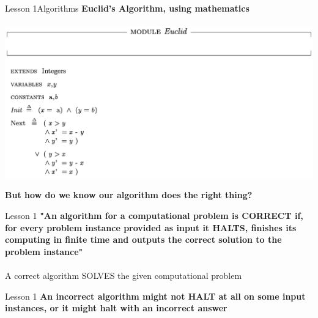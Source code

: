 \documentclass[aspectratio=1610]{beamer}
\begin{document}
\begin{frame}{Lesson 1}{Algorithms}
\Large
\textbf{Euclid's Algorithm, using mathematics}\\~\\
\includegraphics[scale=0.5]{Images/gcdtla}
\end{frame}


\begin{frame}
\begin{center}
\Huge 
\textbf {But how do we know our algorithm does the right thing?}
\end{center}
\end{frame}


\begin{frame}{Lesson 1}{}
\LARGE
\textbf {"An algorithm for a computational problem is CORRECT if, for every problem instance provided as input it HALTS, finishes its computing  in finite time and outputs the correct solution to the problem instance"\\~\\}
A correct algorithm SOLVES the given computational problem

\end{frame}



\begin{frame}{Lesson 1}{}
\LARGE
\textbf {An incorrect algorithm might not HALT at all on some input instances, or it might halt with an incorrect answer\\~\\}
\end{frame}
\end{document}
